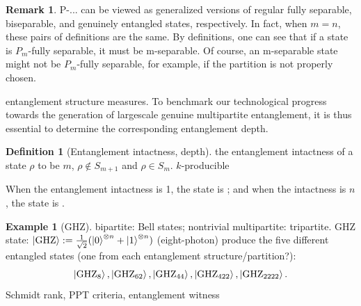 \documentclass[
10pt,
aps,
pra,
linenumbers,
floatfix,
]{revtex4-2}
\theoremstyle{plain}
\theoremstyle{definition}
\newtheorem{definition}{Definition}
\newtheorem{example}{Example}
\newtheorem{remark}{Remark}
\newcommand{\ghz}{\text{GHZ}}
\newcommand{\dm}{\rho}
\begin{document}
\begin{remark}
	P-... can be viewed as generalized versions of regular fully separable, biseparable, and genuinely entangled states, respectively.
	In fact, when $m=n$, these pairs of definitions are the same.
	By definitions, one can see that if a state is $P_m$-fully separable, it must be m-separable. Of course, an m-separable state might not be $P_m$-fully separable, for example, if the partition is not properly chosen.
\end{remark}
entanglement structure measures.
To benchmark our technological progress towards the generation of largescale genuine multipartite entanglement, it is thus essential to determine the corresponding entanglement depth.
\begin{definition}[Entanglement intactness, depth]
	the entanglement intactness of a state $\dm$ to be $m$, \iff $\dm\notin S_{m+1}$ and $\dm\in S_m$.
	$k$-producible
\end{definition}

	When the entanglement intactness is 1, the state is ; and when the intactness is $n$, the state is .
\begin{example}[GHZ]\label{exm:ghz}
	bipartite: Bell states;
	nontrivial multipartite: tripartite.
	GHZ state: $\ket{\ghz}:=\frac{1}{\sqrt{2}}(\ket{0}^{\otimes n} + \ket{1}^{\otimes n} )$ (eight-photon) produce the five different entangled states (one from each entanglement structure/partition?): 
	\begin{equation*}
		\ket{\ghz_8},\ket{\ghz_{62}},\ket{\ghz_{44}},\ket{\ghz_{422}},\ket{\ghz_{2222}}.
	\end{equation*}
	Schmidt rank, PPT criteria, entanglement witness
\end{example}
\end{document}
